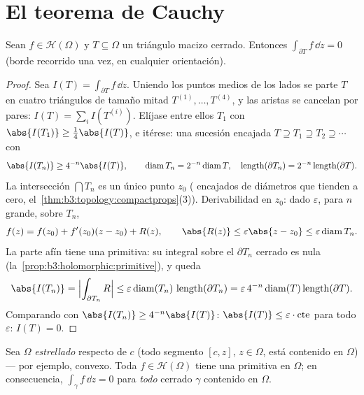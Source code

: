 \section{El teorema de Cauchy}

\begin{theorem}[Goursat]\label{thm:b3:holomorphic:goursat}
Sean $f \in \mathcal H(\Omega)$ y $T \subseteq \Omega$ un triángulo
macizo cerrado. Entonces $\int_{\partial T}f\,\dd z = 0$ (borde
recorrido una vez, en cualquier orientación).
\end{theorem}

\begin{proof}
Sea $I(T) = \int_{\partial T}f\,\dd z$. Uniendo los puntos medios de los
lados se parte $T$ en cuatro triángulos de tamaño mitad $T^{(1)},
\dots, T^{(4)}$, y las aristas  se cancelan por pares: $I(T) =
\sum_iI(T^{(i)})$. Elíjase entre ellos $T_1$ con
$\abs{I(T_1)} \geq \frac14\abs{I(T)}$, e itérese: una sucesión encajada
$T \supseteq T_1 \supseteq T_2 \supseteq\cdots$ con
\[
\abs{I(T_n)} \geq 4^{-n}\abs{I(T)},
\qquad
\operatorname{diam}T_n = 2^{-n}\operatorname{diam}T,
\quad
\operatorname{length}(\partial T_n) =
2^{-n}\operatorname{length}(\partial T).
\]
La intersección $\bigcap T_n$ es un único punto $z_0$
( encajados de diámetros que
tienden a cero, el~\cref{thm:b3:topology:compactprops}(3)).
Derivabilidad en $z_0$: dado $\varepsilon$, para $n$ grande, sobre
$T_n$,
\[
f(z) = f(z_0) + f'(z_0)(z - z_0) + R(z),
\qquad \abs{R(z)} \leq \varepsilon\abs{z - z_0} \leq
\varepsilon\operatorname{diam}T_n .
\]
La parte afín tiene una primitiva: su integral sobre el $\partial T_n$
cerrado es nula (la~\cref{prop:b3:holomorphic:primitive}), y queda
\[
\abs{I(T_n)} = \Bigl|\int_{\partial T_n}R\Bigr|
\leq \varepsilon\operatorname{diam}(T_n)\,
\operatorname{length}(\partial T_n)
= \varepsilon\,4^{-n}\operatorname{diam}(T)
\operatorname{length}(\partial T) .
\]
Comparando con $\abs{I(T_n)} \geq 4^{-n}\abs{I(T)}$:
$\abs{I(T)} \leq \varepsilon\cdot\text{cte}$ para todo
$\varepsilon$: $I(T) = 0$.
\end{proof}

\begin{theorem}
\label{thm:b3:holomorphic:cauchy}
Sea $\Omega$ \emph{estrellado} respecto de $c$ (todo segmento $[c, z]$,
$z \in \Omega$, está contenido en $\Omega$) --- por ejemplo, convexo.
Toda $f \in \mathcal H(\Omega)$ tiene una primitiva en $\Omega$; en
consecuencia, $\int_\gamma f\,\dd z = 0$ para \emph{todo}
 cerrado $\gamma$
contenido en $\Omega$.
\end{theorem}

